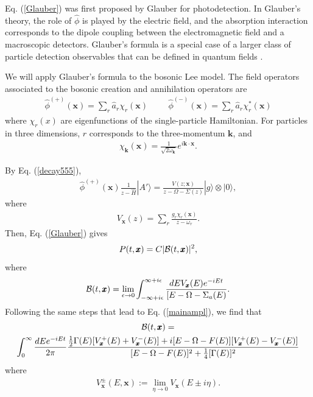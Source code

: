 \documentclass[12pt]{article}
\numberwithin{equation}{section}
\begin{document}
Eq. (\ref{Glauber}) was first proposed by Glauber for photodetection. In Glauber's theory,  the role of $\hat{\phi}$ is played by the electric field, and the absorption interaction corresponds to the dipole coupling between the electromagnetic field and a macroscopic detectors.    Glauber's formula is a special case of a larger class of particle detection observables that can be defined in quantum fields \cite{AnSav}.


We will apply Glauber's formula to the bosonic Lee model. The field operators associated to the bosonic creation and annihilation operators are
\begin{eqnarray}
\hat{\phi}^{(+)}({\pmb x}) = \sum_r \hat{a}_r \chi_r({\pmb x}) \hspace{1cm}  \hat{\phi}^{(-)}({\pmb x}) = \sum_r \hat{a}_r \chi^*_r({\pmb x}) \label{scalar}
\end{eqnarray}
where $\chi_r(x)$ are eigenfunctions of the single-particle Hamiltonian. For particles in three dimensions,  $r$ corresponds to the three-momentum ${\pmb k}$, and
\begin{eqnarray}
\chi_{\pmb k}({\pmb x}) = \frac{1}{\sqrt{2 \omega_{\pmb k}} }e^{i{\pmb k} \cdot {\pmb x}}. \label{chik}
\end{eqnarray}

By Eq. (\ref{decay555}),
\begin{eqnarray}
\hat{\phi}^{(+)}({\pmb x}) \frac{1}{z - \hat{H}} |A'\rangle = \frac{V(z; {\pmb x})}{z - \Omega - \Sigma(z)} |g\rangle \otimes  |0\rangle,
\end{eqnarray}
where
\begin{eqnarray}
V_ {\pmb x}(z)  = \sum_r \frac{g_r \chi_r({\pmb x})  }{z- \omega_r}. \label{Vz}
\end{eqnarray}
Then, Eq. (\ref{Glauber}) gives
\begin{eqnarray}
P(t, {\pmb x})  = C  |{\cal B}(t, {\pmb x})|^2, \label{Glauber2}
\end{eqnarray}
where
\begin{eqnarray}
{\cal B}(t, {\pmb x}) =   \lim_{\epsilon \rightarrow 0} \int_{-\infty+i \epsilon }^{\infty+i \epsilon } \frac{dE V_ {\pmb x}(E)  e^{-iEt}}{[E - \Omega - \Sigma_a(E) }.
\end{eqnarray}
Following the same steps that lead to  Eq. (\ref{mainampl}), we find that
\begin{multline}
{\cal B}(t,  {\pmb x}) = \\
   \int_{0 }^{\infty } \frac{dE e^{-iEt}}{2\pi}  \frac{ \frac{1}{2}\Gamma(E) [V_{\pmb x}^+(E) +V_{\pmb x}^-(E) ] + i [E - \Omega - F(E)][V_{\pmb x}^+(E) - V_{\pmb x}^-(E) ]  }{ [E - \Omega - F(E)]^2 + \frac{1}{4}[\Gamma(E)]^2} \label{mainampl44}
\end{multline}
 where
 \begin{eqnarray}
 V_{\pmb x}^{\pm}(E, {\pmb x}) :=   \lim_{\eta \rightarrow 0 } V_{\pmb x}(E \pm i \eta).
 \end{eqnarray}
\end{document}
